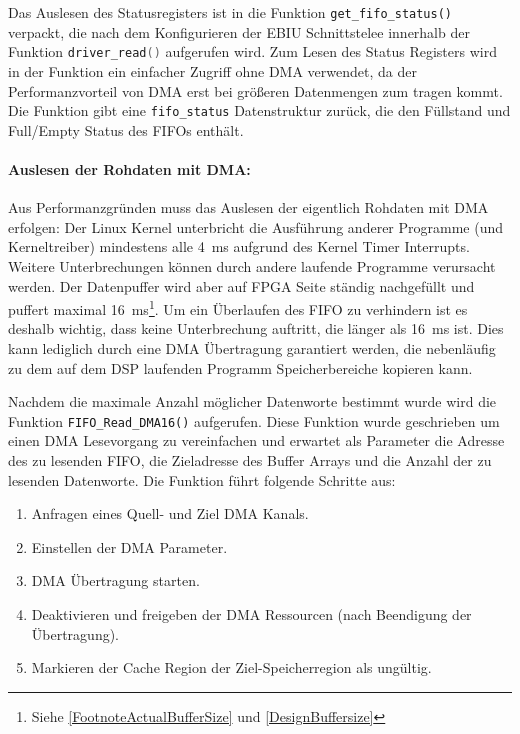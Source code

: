 Das Auslesen des Statusregisters ist in die Funktion \lstinline$get_fifo_status()$ verpackt, die nach dem Konfigurieren der EBIU Schnittstelee innerhalb der Funktion \lstinline[language=C]$driver_read()$ aufgerufen wird. Zum Lesen des Status Registers wird in der Funktion ein einfacher Zugriff ohne DMA verwendet, da der Performanzvorteil von DMA erst bei größeren Datenmengen zum tragen kommt. Die Funktion gibt eine \lstinline$fifo_status$ Datenstruktur zurück, die den Füllstand und Full/Empty Status des FIFOs enthält.  

\paragraph{Auslesen der Rohdaten mit DMA:}
Aus Performanzgründen muss das Auslesen der eigentlich Rohdaten mit DMA erfolgen: Der Linux Kernel unterbricht die Ausführung anderer Programme (und Kerneltreiber) mindestens alle \SI{4}{\milli\second} aufgrund des Kernel Timer Interrupts. Weitere Unterbrechungen können durch andere laufende Programme verursacht werden. Der Datenpuffer wird aber auf FPGA Seite ständig nachgefüllt und puffert maximal \SI{16}{\milli\second}\footnote{Siehe \ref{FootnoteActualBufferSize} und \ref{DesignBuffersize}}. Um ein Überlaufen des FIFO zu verhindern ist es deshalb wichtig, dass keine Unterbrechung auftritt, die länger als \SI{16}{\milli\second} ist. Dies kann lediglich durch eine DMA Übertragung garantiert werden, die nebenläufig zu dem auf dem DSP laufenden Programm Speicherbereiche kopieren kann.

Nachdem die maximale Anzahl möglicher Datenworte bestimmt wurde wird die Funktion \lstinline$FIFO_Read_DMA16()$ aufgerufen. Diese Funktion wurde geschrieben um einen DMA Lesevorgang zu vereinfachen und erwartet als Parameter die Adresse des zu lesenden FIFO, die Zieladresse des Buffer Arrays und die Anzahl der zu lesenden Datenworte. Die Funktion führt folgende Schritte aus:

\begin{enumerate}
    \item Anfragen eines Quell- und Ziel DMA Kanals.
    \item Einstellen der DMA Parameter.
    \item DMA Übertragung starten.
    \item Deaktivieren und freigeben der DMA Ressourcen (nach Beendigung der Übertragung).
    \item Markieren der Cache Region der Ziel-Speicherregion als ungültig.
\end{enumerate}

